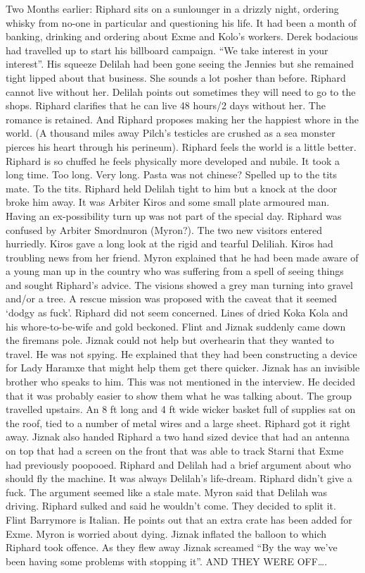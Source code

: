 \begin{multicols}{2}
Two Months earlier: Riphard sits on a sunlounger in a drizzly night, ordering whisky from no-one in particular and questioning his life. It had been a month of banking, drinking and ordering about Exme and Kolo’s workers. Derek bodacious had travelled up to start his billboard campaign. “We take interest in your interest”. His squeeze Delilah had been gone seeing the Jennies but she remained tight lipped about that business. She sounds a lot posher than before. Riphard cannot live without her. Delilah points out sometimes they will need to go to the shops. Riphard clarifies that he can live 48 hours/2 days without her. The romance is retained. And Riphard proposes making her the happiest whore in the world. (A thousand miles away Pilch’s testicles are crushed as a sea monster pierces his heart through his perineum). Riphard feels the world is a little better. Riphard is so chuffed he feels physically more developed and nubile. It took a long time. Too long. Very long. Pasta was not chinese? Spelled up to the tits mate. To the tits. Riphard held Delilah tight to him but a knock at the door broke him away. It was Arbiter Kiros and some small plate armoured man. Having an ex-possibility turn up was not part of the special day. Riphard was confused by Arbiter Smordnuron (Myron?). The two new visitors entered hurriedly. Kiros gave a long look at the rigid and tearful Deliliah. Kiros had troubling news from her friend. Myron explained that he had been made aware of a young man up in the country who was suffering from a spell of seeing things and sought Riphard’s advice. The visions showed a grey man turning into gravel and/or a tree. A rescue mission was proposed with the caveat that it seemed ‘dodgy as fuck’. Riphard did not seem concerned. Lines of dried Koka Kola and his whore-to-be-wife and gold beckoned. Flint and Jiznak suddenly came down the firemans pole. Jiznak could not help but overhearin that they wanted to travel. He was not spying. He explained that they had been constructing a device for Lady Haramxe that might help them get there quicker. Jiznak has an invisible brother who speaks to him. This was not mentioned in the interview. He decided that it was probably easier to show them what he was talking about. The group travelled upstairs. An 8 ft long and 4 ft wide wicker basket full of supplies sat on the roof, tied to a number of metal wires and a large sheet. Riphard got it right away. Jiznak also handed Riphard a two hand sized device that had an antenna on top that had a screen on the front that was able to track Starni that Exme had previously poopooed. Riphard and Delilah had a brief argument about who should fly the machine. It was always Delilah’s life-dream. Riphard didn’t give a fuck. The argument seemed like a stale mate. Myron said that Delilah was driving. Riphard sulked and said he wouldn’t come. They decided to split it. Flint Barrymore is Italian. He points out that an extra crate has been added for Exme. Myron is worried about dying. Jiznak inflated the balloon to which Riphard took offence. As they flew away Jiznak screamed “By the way we’ve been having some problems with stopping it”. AND THEY WERE OFF….\medskip


\end{multicols}
